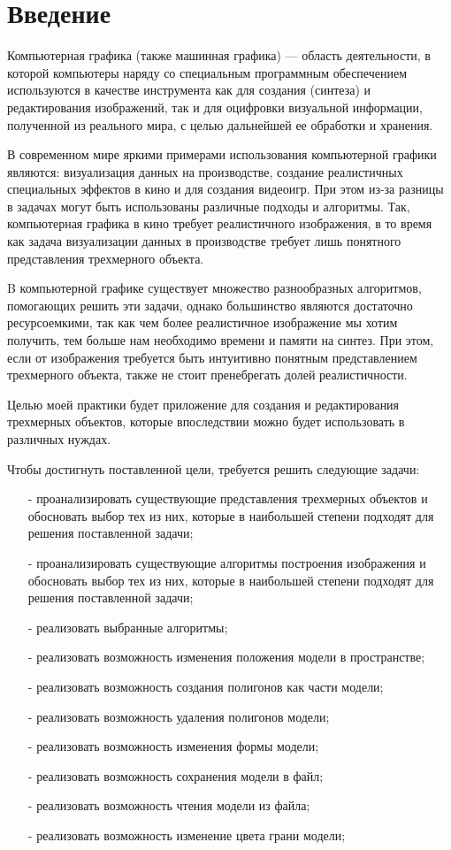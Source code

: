\chapter*{Введение}

Компьютерная графика (также машинная графика) — область деятельности, в которой компьютеры наряду со специальным программным обеспечением используются в качестве инструмента как для создания (синтеза) и редактирования изображений, так и для оцифровки визуальной информации, полученной из реального мира, с целью дальнейшей ее обработки и хранения.

В современном мире яркими примерами использования компьютерной графики являются: визуализация данных на производстве, создание реалистичных специальных эффектов в кино и для создания видеоигр.
При этом из-за разницы в задачах могут быть использованы различные подходы и алгоритмы. Так, компьютерная графика в кино требует реалистичного изображения, в то время как задача визуализации данных в производстве требует лишь понятного представления трехмерного объекта.

B компьютерной графике существует множество разнообразных алгоритмов, помогающих решить эти задачи, однако большинство являются достаточно ресурсоемкими, так как чем более реалистичное изображение мы хотим получить, тем больше нам необходимо времени и памяти на синтез. При этом, если от изображения требуется быть интуитивно понятным представлением трехмерного объекта, также не стоит пренебрегать долей реалистичности.

Целью моей практики будет приложение для создания и редактирования трехмерных объектов, которые впоследствии можно будет использовать в различных нуждах.

Чтобы достигнуть поставленной цели, требуется решить следующие задачи:
\begin{itemize}
	\item[-] проанализировать существующие представления трехмерных объектов и обосновать выбор тех из них, которые в наибольшей степени подходят для решения поставленной задачи;
	\item[-] проанализировать существующие алгоритмы построения изображения и обосновать выбор тех из них, которые в наибольшей степени подходят для решения поставленной задачи;
	\item[-] реализовать выбранные алгоритмы;
	\item[-] реализовать возможность изменения положения модели в пространстве;
	\item[-] реализовать возможность создания полигонов как части модели;
	\item[-] реализовать возможность удаления полигонов модели;
	\item[-] реализовать возможность изменения формы модели;
	\item[-] реализовать возможность сохранения модели в файл;
	\item[-] реализовать возможность чтения модели из файла;
	\item[-] реализовать возможность изменение цвета грани модели;
\end{itemize}